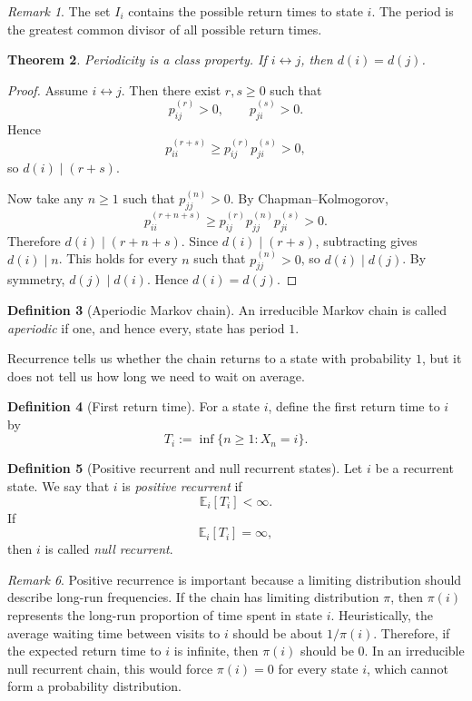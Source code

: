 \documentclass[11pt]{article}
\theoremstyle{plain}
\newtheorem{theorem}{Theorem}[section]
\theoremstyle{definition}
\newtheorem{definition}[theorem]{Definition}
\theoremstyle{remark}
\newtheorem{remark}[theorem]{Remark}
\begin{document}
	\begin{remark}
		The set \(I_i\) contains the possible return times to state \(i\). The period is the greatest common divisor of all possible return times.
	\end{remark}
	
	\begin{theorem}
		Periodicity is a class property. If \(i\leftrightarrow j\), then \(d(i)=d(j)\).
	\end{theorem}
	
	\begin{proof}
		Assume \(i\leftrightarrow j\). Then there exist \(r,s\ge 0\) such that
		\[
		p_{ij}^{(r)}>0,
		\qquad
		p_{ji}^{(s)}>0.
		\]
		Hence
		\[
		p_{ii}^{(r+s)}
		\ge
		p_{ij}^{(r)}p_{ji}^{(s)}
		>0,
		\]
		so \(d(i)\mid(r+s)\).
		
		Now take any \(n\ge 1\) such that \(p_{jj}^{(n)}>0\). By Chapman--Kolmogorov,
		\[
		p_{ii}^{(r+n+s)}
		\ge
		p_{ij}^{(r)}p_{jj}^{(n)}p_{ji}^{(s)}
		>0.
		\]
		Therefore \(d(i)\mid(r+n+s)\). Since \(d(i)\mid(r+s)\), subtracting gives \(d(i)\mid n\). This holds for every \(n\) such that \(p_{jj}^{(n)}>0\), so \(d(i)\mid d(j)\). By symmetry, \(d(j)\mid d(i)\). Hence \(d(i)=d(j)\).
	\end{proof}
	
	\begin{definition}[Aperiodic Markov chain]
		An irreducible Markov chain is called \emph{aperiodic} if one, and hence every, state has period \(1\).
	\end{definition}
	
	
	
	
	
	Recurrence tells us whether the chain returns to a state with probability \(1\), but it does not tell us how long we need to wait on average.
	
	\begin{definition}[First return time]
		For a state \(i\), define the first return time to \(i\) by
		\[
		T_i:=\inf\{n\ge 1:X_n=i\}.
		\]
	\end{definition}
	
	\begin{definition}[Positive recurrent and null recurrent states]
		Let \(i\) be a recurrent state. We say that \(i\) is \emph{positive recurrent} if
		\[
		\mathbb{E}_i[T_i]<\infty.
		\]
		If
		\[
		\mathbb{E}_i[T_i]=\infty,
		\]
		then \(i\) is called \emph{null recurrent}.
	\end{definition}
	
	\begin{remark}
		Positive recurrence is important because a limiting distribution should describe long-run frequencies. If the chain has limiting distribution \(\pi\), then \(\pi(i)\) represents the long-run proportion of time spent in state \(i\). Heuristically, the average waiting time between visits to \(i\) should be about \(1/\pi(i)\). Therefore, if the expected return time to \(i\) is infinite, then \(\pi(i)\) should be \(0\). In an irreducible null recurrent chain, this would force \(\pi(i)=0\) for every state \(i\), which cannot form a probability distribution.
	\end{remark}
	
\end{document}
